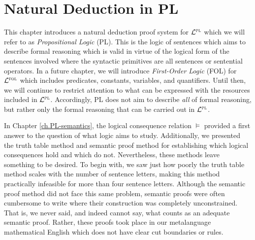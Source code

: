 \chapter{Natural Deduction in PL}
\label{ch.PL-deduction}


This chapter introduces a natural deduction proof system for $\mathcal{L}^{\textsc{pl}}$ which we will refer to as \textit{Propositional Logic} (PL).
This is the logic of sentences which aims to describe formal reasoning which is valid in virtue of the logical form of the sentences involved where the syntactic primitives are all sentences or sentential operators.
In a future chapter, we will introduce \textit{First-Order Logic} (FOL) for $\mathcal{L}^{\textsc{fol}}$ which includes predicates, constants, variables, and quantifiers. 
Until then, we will continue to restrict attention to what can be expressed with the resources included in $\mathcal{L}^{\textsc{pl}}$.
Accordingly, PL does not aim to describe \textit{all} of formal reasoning, but rather only the formal reasoning that can be carried out in $\mathcal{L}^{\textsc{pl}}$.

In Chapter \ref{ch.PL-semantics}, the logical consequence relation $\vDash$ provided a first answer to the question of what logic aims to study.
Additionally, we presented the truth table method and semantic proof method for establishing which logical consequences hold and which do not.
Nevertheless, these methods leave something to be desired.
To begin with, we saw just how poorly the truth table method scales with the number of sentence letters, making this method practically infeasible for more than four sentence letters.
Although the semantic proof method did not face this same problem, semantic proofs were often cumbersome to write where their construction was completely unconstrained.
That is, we never said, and indeed cannot say, what counts as an adequate semantic proof.
Rather, these proofs took place in our metalanguage mathematical English which does not have clear cut boundaries or rules.


